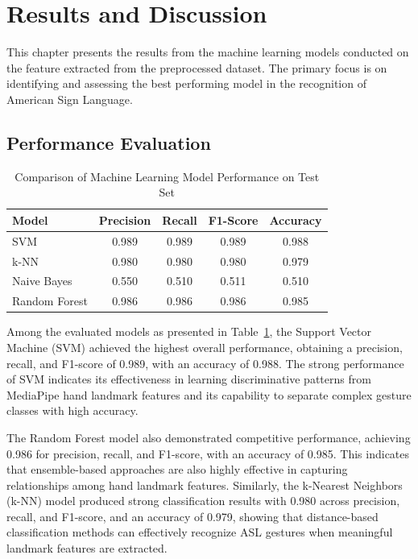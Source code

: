 \section{Results and Discussion}

This chapter presents the results from the machine learning models conducted on the feature extracted from the preprocessed dataset. The primary focus is on identifying and assessing the best performing model in the recognition of American Sign Language.

\subsection{Performance Evaluation}

\begin{table}[htbp]
\centering
\small
\renewcommand{\arraystretch}{1.2}
\setlength{\tabcolsep}{4pt}
\caption{Comparison of Machine Learning Model Performance on Test Set}
\label{tab:ML_comp}
\begin{tabular}{|p{3cm}|cccc|}
\hline
\textbf{Model}& \textbf{Precision} & \textbf{Recall} & \textbf{F1-Score} & \textbf{Accuracy} \\
\hline
SVM & 0.989 & 0.989 & 0.989 & 0.988 \\
k-NN & 0.980 & 0.980 & 0.980 & 0.979 \\
Naive Bayes & 0.550 & 0.510 & 0.511 & 0.510 \\
Random Forest & 0.986 & 0.986 & 0.986 & 0.985 \\
\hline
\end{tabular}
\end{table}

Among the evaluated models as presented in Table~\ref{tab:ML_comp}, the Support Vector Machine (SVM) achieved the highest overall performance, obtaining a precision, recall, and F1-score of 0.989, with an accuracy of 0.988. The strong performance of SVM indicates its effectiveness in learning discriminative patterns from MediaPipe hand landmark features and its capability to separate complex gesture classes with high accuracy.

The Random Forest model also demonstrated competitive performance, achieving 0.986 for precision, recall, and F1-score, with an accuracy of 0.985. This indicates that ensemble-based approaches are also highly effective in capturing relationships among hand landmark features. Similarly, the k-Nearest Neighbors (k-NN) model produced strong classification results with 0.980 across precision, recall, and F1-score, and an accuracy of 0.979, showing that distance-based classification methods can effectively recognize ASL gestures when meaningful landmark features are extracted.


